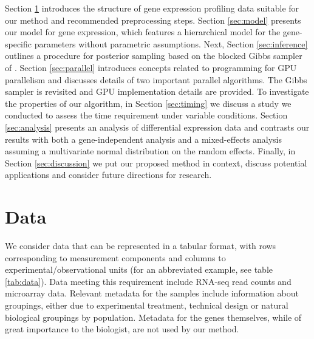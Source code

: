 Section \ref{sec:data} introduces the structure of gene expression profiling data suitable for our method and recommended preprocessing steps. Section \ref{sec:model} presents our model for gene expression, which features a hierarchical model for the gene-specific parameters without parametric assumptions. Next, Section \ref{sec:inference} outlines a procedure for posterior sampling based on the blocked Gibbs sampler of \cite{ishwaran2000}. Section \ref{sec:parallel} introduces concepts related to programming for GPU parallelism and discusses details of two important parallel algorithms. The Gibbs sampler is revisited and GPU implementation details are provided. To investigate the properties of our algorithm, in Section \ref{sec:timing} we discuss a study we conducted to assess the time requirement under variable conditions. Section \ref{sec:analysis} presents an analysis of differential expression data and contrasts our results with both a gene-independent analysis and a mixed-effects analysis assuming a multivariate normal distribution on the random effects. Finally, in Section \ref{sec:discussion} we put our proposed method in context, discuss potential applications and consider future directions for research.
\section{Data}
\label{sec:data}
We consider data that can be represented in a tabular format, with rows corresponding to measurement components and columns to experimental/observational units (for an abbreviated example, see table \ref{tab:data}). Data meeting this requirement include RNA-seq read counts and microarray data. Relevant metadata for the samples include information about groupings, either due to experimental treatment, technical design or natural biological groupings by population. Metadata for the genes themselves, while of great importance to the biologist, are not used by our method.

